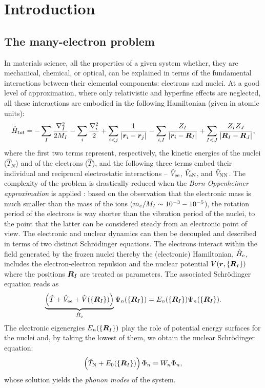 \cleardoublepage
\chapter{Introduction\label{ch:introduction}}

\section{The many-electron problem}
In materials science, all the properties of a given system whether, they are mechanical, chemical, or optical, can be explained in terms of the fundamental interactions between their elemental components: electrons and nuclei. At a good level of approximation, where only relativistic and hyperfine effects are neglected, all these interactions are embodied in the following Hamiltonian (given in atomic units):
%
\begin{equation}
    \hat{H}_{tot} = - \sum_I \frac{\nabla_I^2}{2M_I} - \sum_i \frac{\nabla_i^2}{2} + \sum_{i < j} \frac{1}{|{\bm r}_i - {\bm r}_j|} - \sum_{i,I} \frac{Z_I}{|{\bm r}_i - {\bm R}_I|} + \sum_{I < J} \frac{Z_I Z_J}{|{\bm R}_I - {\bm R}_J|} ,
    \label{eq:many-body}
\end{equation}
%
where the first two terms represent, respectively, the kinetic energies of the nuclei ($\hat{T}_N$) and of the electrons ($\hat{T}$), and the following three terms embed their individual and reciprocal electrostatic interactions -- $\hat{V}_{\rm ee}$, $\hat{V}_{\rm eN}$, and $\hat{V}_{\rm NN}$. The complexity of the problem is drastically reduced when the \emph{Born-Oppenheimer approximation} is applied \cite{born_zur_1927}: based on the observation that the electronic mass is much smaller than the mass of the ions ($m_e / M_I \thicksim 10^{-3} - 10^{-5}$), the rotation period of the electrons is way shorter than the vibration period of the nuclei, to the point that the latter can be considered steady from an electronic point of view. The electronic and nuclear dynamics can then be decoupled and described in terms of two distinct Schr\"{o}dinger equations. The electrons interact within the field generated by the frozen nuclei thereby the (electronic) Hamiltonian, $\hat{H}_{\rm e}$, includes the electron-electron repulsion and the nuclear potential $V({\bm r},\{ {\bm R}_I \})$ where the positions ${\bm R}_I$ are treated as parameters. The associated Schr\"{o}dinger equation reads as
%
\begin{equation}
    \underbrace{\left( \hat{T} + \hat{V}_{\rm ee} + \hat{V}(\{ {\bm R}_I \}) \right)}_{\hat{H}_{\rm e}} \Psi_n(\{ {\bm R}_I \}) = E_n(\{ {\bm R}_I \}) \Psi_n(\{ {\bm R}_I \}) .
    \label{eq:many-electron-problem}
\end{equation}
%
The electronic eigenergies $E_n(\{ {\bm R}_I \})$ play the role of potential energy surfaces for the nuclei and, by taking the lowest of them, we obtain the nuclear Schr\"{o}dinger equation:
%
\begin{equation}
    \left( \hat{T}_{\rm N} + E_0(\{ {\bm R}_I \}) \right) \Phi_n = W_n \Phi_n ,
    \label{eq:nuclear-schrodinger-eq}
\end{equation}
%
whose solution yields the \emph{phonon modes} of the system.

